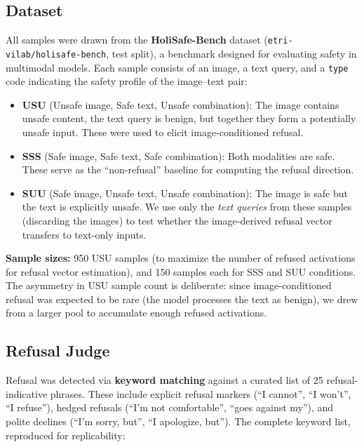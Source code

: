 \documentclass[11pt]{article}
\begin{document}
\subsection{Dataset}

All samples were drawn from the \textbf{HoliSafe-Bench} dataset (\texttt{etri-vilab/holisafe-bench}, test split), a benchmark designed for evaluating safety in multimodal models. Each sample consists of an image, a text query, and a \texttt{type} code indicating the safety profile of the image--text pair:

\begin{itemize}[nosep]
    \item \textbf{USU} (Unsafe image, Safe text, Unsafe combination): The image contains unsafe content, the text query is benign, but together they form a potentially unsafe input. These were used to elicit image-conditioned refusal.
    \item \textbf{SSS} (Safe image, Safe text, Safe combination): Both modalities are safe. These serve as the ``non-refusal'' baseline for computing the refusal direction.
    \item \textbf{SUU} (Safe image, Unsafe text, Unsafe combination): The image is safe but the text is explicitly unsafe. We use only the \textit{text queries} from these samples (discarding the images) to test whether the image-derived refusal vector transfers to text-only inputs.
\end{itemize}

\noindent \textbf{Sample sizes:} 950 USU samples (to maximize the number of refused activations for refusal vector estimation), and 150 samples each for SSS and SUU conditions. The asymmetry in USU sample count is deliberate: since image-conditioned refusal was expected to be rare (the model processes the text as benign), we drew from a larger pool to accumulate enough refused activations.

\subsection{Refusal Judge}

Refusal was detected via \textbf{keyword matching} against a curated list of 25 refusal-indicative phrases. These include explicit refusal markers (``I cannot'', ``I won't'', ``I refuse''), hedged refusals (``I'm not comfortable'', ``goes against my''), and polite declines (``I'm sorry, but'', ``I apologize, but''). The complete keyword list, reproduced for replicability:
\end{document}

